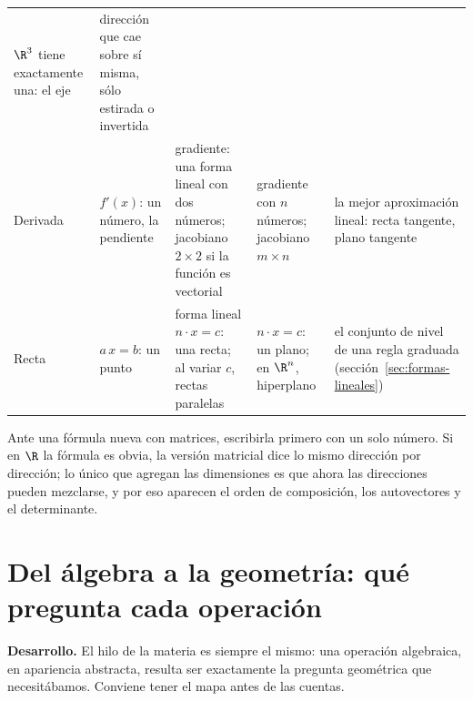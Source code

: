 {\begin{tabularx}{\textwidth}{>{\bfseries\raggedright\arraybackslash}p{17mm}>{\raggedright\arraybackslash}p{26mm}>{\raggedright\arraybackslash}p{32mm}>{\raggedright\arraybackslash}p{32mm}Y}
\(\R^3\) tiene exactamente una: el eje & dirección que cae sobre sí misma, sólo estirada o
invertida\\
\addlinespace
Derivada & \(f'(x)\): un número, la pendiente & gradiente: una forma lineal con dos
números; jacobiano \(2\times2\) si la función es vectorial & gradiente con \(n\) números;
jacobiano \(m\times n\) & la mejor aproximación lineal: recta tangente, plano tangente\\
\addlinespace
Recta & \(a\,x=b\): un punto & forma lineal \(n\cdot x=c\): una recta; al variar \(c\),
rectas paralelas & \(n\cdot x=c\): un plano; en \(\R^n\), hiperplano & el conjunto de
nivel de una regla graduada (sección~\ref{sec:formas-lineales})\\
\bottomrule
\end{tabularx}
}

\begin{idea}
Ante una fórmula nueva con matrices, escribirla primero con un solo número. Si en \(\R\)
la fórmula es obvia, la versión matricial dice lo mismo dirección por dirección; lo único
que agregan las dimensiones es que ahora las direcciones pueden mezclarse, y por eso
aparecen el orden de composición, los autovectores y el determinante.
\end{idea}

\section{Del álgebra a la geometría: qué pregunta cada operación}\label{sec:algebra-geometria}

\textbf{Desarrollo.} El hilo de la materia es siempre el mismo: una operación algebraica,
en apariencia abstracta, resulta ser exactamente la pregunta geométrica que necesitábamos.
Conviene tener el mapa antes de las cuentas.


